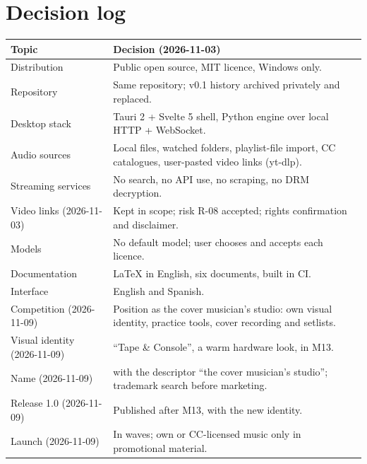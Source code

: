 \documentclass{covermaker}
\begin{document}
\chapter{Decision log}
\begin{tabularx}{\linewidth}{@{}lY@{}}
\toprule
\textbf{Topic} & \textbf{Decision (2026-11-03)} \\
\midrule
Distribution & Public open source, MIT licence, Windows only. \\
Repository & Same repository; v0.1 history archived privately and replaced. \\
Desktop stack & Tauri 2 + Svelte 5 shell, Python engine over local HTTP + WebSocket. \\
Audio sources & Local files, watched folders, playlist-file import, CC catalogues, user-pasted video links (yt-dlp). \\
Streaming services & No search, no API use, no scraping, no DRM decryption. \\
Video links (2026-11-03) & Kept in scope; risk R-08 accepted; rights confirmation and disclaimer. \\
Models & No default model; user chooses and accepts each licence. \\
Documentation & LaTeX in English, six documents, built in CI. \\
Interface & English and Spanish. \\
Competition (2026-11-09) & Position \CM{} as the cover musician's studio:
own visual identity, practice tools, cover recording and setlists. \\
Visual identity (2026-11-09) & ``Tape \& Console'', a warm hardware look, in M13. \\
Name (2026-11-09) & \CM{} with the descriptor ``the cover musician's studio'';
trademark search before marketing. \\
Release 1.0 (2026-11-09) & Published after M13, with the new identity. \\
Launch (2026-11-09) & In waves; own or CC-licensed music only in promotional material. \\
\bottomrule
\end{tabularx}

\printnoidxglossaries
\end{document}
